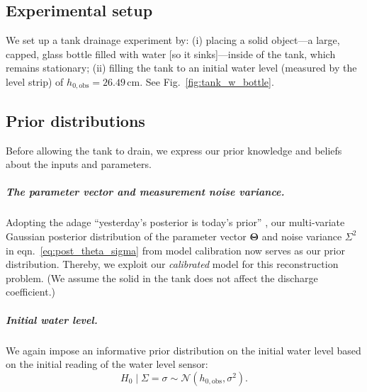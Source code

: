 \documentclass[openacc]{rsproca_new}%
\begin{document}
\subsection{Experimental setup}
We set up a tank drainage experiment by:
(i) placing a solid object---a large, capped, glass bottle filled with water [so it sinks]---inside of the tank, which remains stationary;
(ii) filling the tank to an initial water level (measured by the level strip) of $h_{0, \text{obs}}=26.49$\,cm. 
See Fig.~\ref{fig:tank_w_bottle}.


\subsection{Prior distributions}
Before allowing the tank to drain, we express our prior knowledge and beliefs about the inputs and parameters. 

\subparagraph{The parameter vector and measurement noise variance.}
Adopting the adage ``yesterday's posterior is today's prior'' \cite{calvetti2010subjective}, 
our multi-variate Gaussian posterior distribution of the parameter vector $\boldsymbol \Theta$ and noise variance $\Sigma^2$ in eqn.~\ref{eq:post_theta_sigma} from model calibration now serves as our prior distribution.
Thereby, we exploit our \emph{calibrated} model for this reconstruction problem.
(We assume the solid in the tank does not affect the discharge coefficient.)

\vspace{-\baselineskip}
\subparagraph{Initial water level.} We again impose an informative prior distribution on the initial water level based on the initial reading of the water level sensor:
\begin{equation}
	H_0 \mid \Sigma = \sigma \sim \mathcal{N}(h_{0, \text{obs}}, \sigma^2).
\end{equation}
\end{document}

